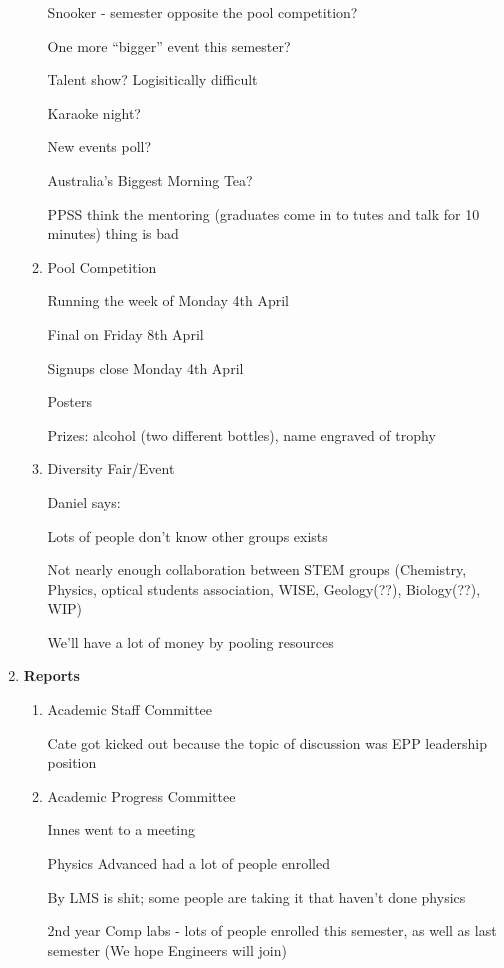 \documentclass[a4paper,12pt]{article}
\newcommand{\itemi}[1]{\bf\large #1}
\begin{document}
\begin{enumerate}
\begin{enumerate}
	Snooker - semester opposite the pool competition?
	
	One more ``bigger'' event this semester?
	
	Talent show? Logisitically difficult
	
	Karaoke night?
	
	New events poll?	
	
	Australia's Biggest Morning Tea?
	
	PPSS think the mentoring (graduates come in to tutes and talk for 10 minutes) thing is bad
	
	
	\item Pool Competition
	
	Running the week of Monday 4th April
	
	Final on Friday 8th April
	
	Signups close Monday 4th April
	
	Posters
	
	Prizes: alcohol (two different bottles), name engraved of trophy
		
	
	\item Diversity Fair/Event
	
	Daniel says:
	
	Lots of people don't know other groups exists
	
	Not nearly enough collaboration between STEM groups (Chemistry, Physics, optical students association, WISE, Geology(??), Biology(??), WIP)
	
	We'll have a lot of money by pooling resources
	
		
	
	\end{enumerate}
\item {\itemi Reports}
	\begin{enumerate}
	\item Academic Staff Committee

	Cate got kicked out because the topic of discussion was EPP leadership position	
	
	\item Academic Progress Committee
	
	Innes went to a meeting
	
	Physics Advanced had a lot of people enrolled
	
	By LMS is shit; some people are taking it that haven't done physics
	
	2nd year Comp labs - lots of people enrolled this semester, as well as last semester (We hope Engineers will join)
	

\end{enumerate}
\end{enumerate}
\end{document}
